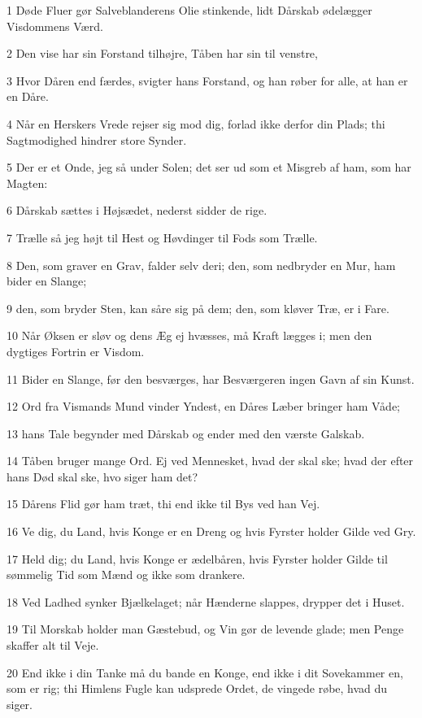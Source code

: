\par 1 Døde Fluer gør Salveblanderens Olie stinkende, lidt Dårskab ødelægger Visdommens Værd.
\par 2 Den vise har sin Forstand tilhøjre, Tåben har sin til venstre,
\par 3 Hvor Dåren end færdes, svigter hans Forstand, og han røber for alle, at han er en Dåre.
\par 4 Når en Herskers Vrede rejser sig mod dig, forlad ikke derfor din Plads; thi Sagtmodighed hindrer store Synder.
\par 5 Der er et Onde, jeg så under Solen; det ser ud som et Misgreb af ham, som har Magten:
\par 6 Dårskab sættes i Højsædet, nederst sidder de rige.
\par 7 Trælle så jeg højt til Hest og Høvdinger til Fods som Trælle.
\par 8 Den, som graver en Grav, falder selv deri; den, som nedbryder en Mur, ham bider en Slange;
\par 9 den, som bryder Sten, kan såre sig på dem; den, som kløver Træ, er i Fare.
\par 10 Når Øksen er sløv og dens Æg ej hvæsses, må Kraft lægges i; men den dygtiges Fortrin er Visdom.
\par 11 Bider en Slange, før den besværges, har Besværgeren ingen Gavn af sin Kunst.
\par 12 Ord fra Vismands Mund vinder Yndest, en Dåres Læber bringer ham Våde;
\par 13 hans Tale begynder med Dårskab og ender med den værste Galskab.
\par 14 Tåben bruger mange Ord. Ej ved Mennesket, hvad der skal ske; hvad der efter hans Død skal ske, hvo siger ham det?
\par 15 Dårens Flid gør ham træt, thi end ikke til Bys ved han Vej.
\par 16 Ve dig, du Land, hvis Konge er en Dreng og hvis Fyrster holder Gilde ved Gry.
\par 17 Held dig; du Land, hvis Konge er ædelbåren, hvis Fyrster holder Gilde til sømmelig Tid som Mænd og ikke som drankere.
\par 18 Ved Ladhed synker Bjælkelaget; når Hænderne slappes, drypper det i Huset.
\par 19 Til Morskab holder man Gæstebud, og Vin gør de levende glade; men Penge skaffer alt til Veje.
\par 20 End ikke i din Tanke må du bande en Konge, end ikke i dit Sovekammer en, som er rig; thi Himlens Fugle kan udsprede Ordet, de vingede røbe, hvad du siger.


